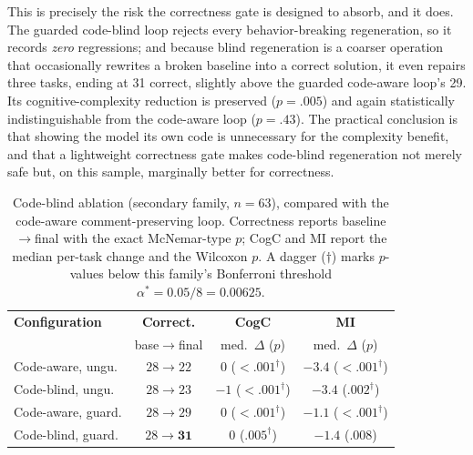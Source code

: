 This is precisely the risk the correctness gate is designed to absorb, and it
does. The guarded code-blind loop rejects every behavior-breaking regeneration, so
it records \emph{zero} regressions; and because blind regeneration is a coarser
operation that occasionally rewrites a broken baseline into a correct solution, it
even repairs three tasks, ending at 31 correct, slightly above the guarded
code-aware loop's 29. Its cognitive-complexity reduction is preserved ($p=.005$)
and again statistically indistinguishable from the code-aware loop ($p=.43$). The
practical conclusion is that showing the model its own code is unnecessary for the
complexity benefit, and that a lightweight correctness gate makes code-blind
regeneration not merely safe but, on this sample, marginally better for
correctness.

\begin{table}[t]
  \centering
  \footnotesize
  \setlength{\tabcolsep}{2pt}
  \caption{Code-blind ablation (secondary family, $n=63$), compared with the
    code-aware comment-preserving loop. Correctness reports
    baseline$\rightarrow$final with the exact McNemar-type $p$; CogC and MI report the
    median per-task change and the Wilcoxon $p$. A dagger ($\dagger$) marks
    $p$-values below this family's Bonferroni threshold
    $\alpha^\ast = 0.05/8 = 0.00625$.}
  \label{tab:blind}
  \begin{tabular}{lccc}
    \toprule
    \textbf{Configuration} & \textbf{Correct.} & \textbf{CogC} & \textbf{MI} \\
    & base$\rightarrow$final & med.\ $\Delta$ ($p$) & med.\ $\Delta$ ($p$) \\
    \midrule
    Code-aware, ungu.  & $28\!\to\!22$ & $0$ ($<.001^\dagger$) & $-3.4$ ($<.001^\dagger$) \\
    Code-blind, ungu.  & $28\!\to\!23$ & $-1$ ($<.001^\dagger$) & $-3.4$ ($.002^\dagger$) \\
    Code-aware, guard. & $28\!\to\!29$ & $0$ ($<.001^\dagger$) & $-1.1$ ($<.001^\dagger$) \\
    Code-blind, guard. & $28\!\to\!\mathbf{31}$ & $0$ ($.005^\dagger$) & $-1.4$ ($.008$) \\
    \bottomrule
  \end{tabular}
\end{table}
